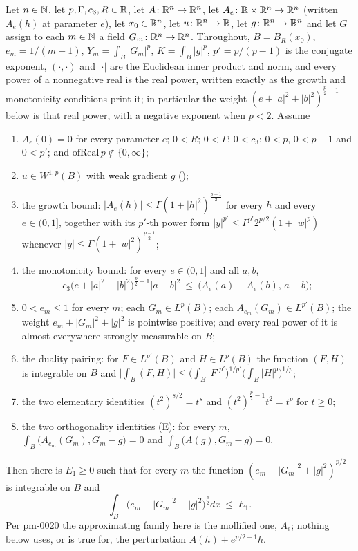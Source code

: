 \begin{helper}
Let $n\in\mathbb{N}$, let $p,\Gamma,c_3,R\in\mathbb{R}$, let $A\colon\mathbb{R}^n\to\mathbb{R}^n$, let
$A_e\colon\mathbb{R}\times\mathbb{R}^n\to\mathbb{R}^n$ (written $A_e(h)$ at parameter $e$), let
$x_0\in\mathbb{R}^n$, let $u\colon\mathbb{R}^n\to\mathbb{R}$, let $g\colon\mathbb{R}^n\to\mathbb{R}^n$ and let $G$
assign to each $m\in\mathbb{N}$ a field $G_m\colon\mathbb{R}^n\to\mathbb{R}^n$.  Throughout,
$B=B_R(x_0)$, $e_m=1/(m+1)$, $Y_m=\int_B|G_m|^p$, $K=\int_B|g|^p$,
$p'=p/(p-1)$ is the conjugate exponent, $(\cdot,\cdot)$ and $|\cdot|$ are the
Euclidean inner product and norm, and every power of a nonnegative real is the
real power, written exactly as the growth and monotonicity conditions print it;
in particular the weight $(e+|a|^2+|b|^2)^{\frac p2-1}$ below is that real
power, with a negative exponent when $p<2$.  Assume
\begin{enumerate}
\item[(H1)] $A_e(0)=0$ for every parameter $e$; $0<R$; $0<\Gamma$; $0<c_3$;
  $0<p$, $0<p-1$ and $0<p'$; and $\mathrm{ofReal}\,p\notin\{0,\infty\}$;
\item[(H2)] $u\in W^{1,p}(B)$ with weak gradient $g$ ();
\item[(H3)] the growth bound: $|A_e(h)|\le\Gamma(1+|h|^2)^{\frac{p-1}2}$ for
  every $h$ and every $e\in(0,1]$, together with its $p'$-th power form
  $|y|^{p'}\le\Gamma^{p'}2^{p/2}(1+|w|^p)$ whenever
  $|y|\le\Gamma(1+|w|^2)^{\frac{p-1}2}$;
\item[(H4)] the monotonicity bound: for every $e\in(0,1]$ and all $a,b$,
  \[
  c_3\bigl(e+|a|^2+|b|^2\bigr)^{\frac p2-1}|a-b|^2
    \ \le\ \bigl(A_e(a)-A_e(b),\,a-b\bigr);
  \]
\item[(H5)] $0<e_m\le1$ for every $m$; each $G_m\in L^p(B)$; each
  $A_{e_m}(G_m)\in L^{p'}(B)$; the weight $e_m+|G_m|^2+|g|^2$ is pointwise
  positive; and every real power of it is almost-everywhere strongly measurable
  on $B$;
\item[(H6)] the duality pairing: for $F\in L^{p'}(B)$ and $H\in L^p(B)$ the
  function $(F,H)$ is integrable on $B$ and
  $\bigl|\int_B(F,H)\bigr|\le\bigl(\int_B|F|^{p'}\bigr)^{1/p'}\bigl(\int_B|H|^p\bigr)^{1/p}$;
\item[(H7)] the two elementary identities $(t^2)^{s/2}=t^s$ and
  $(t^2)^{\frac p2-1}t^2=t^p$ for $t\ge0$;
\item[(H8)] the two orthogonality identities (E): for every $m$,
  $\int_B\bigl(A_{e_m}(G_m),G_m-g\bigr)=0$ and
  $\int_B\bigl(A(g),G_m-g\bigr)=0$.
\end{enumerate}
Then there is $E_1\ge0$ such that for every $m$ the function
$(e_m+|G_m|^2+|g|^2)^{p/2}$ is integrable on $B$ and
\[
\int_B\bigl(e_m+|G_m|^2+|g|^2\bigr)^{\frac p2}dx\ \le\ E_1 .
\]
Per pm-0020 the approximating family here is the mollified one, $A_e$; nothing
below uses, or is true for, the perturbation $A(h)+e^{p/2-1}h$.
\end{helper}
